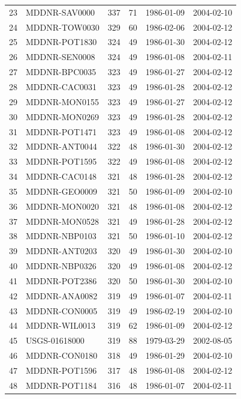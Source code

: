 \documentclass[a4paper,11pt]{article}\usepackage[]{graphicx}\usepackage[]{color}
\begin{document}
\begin{table}[ht]
\begin{tabular}{rlrrll}
  23 & MDDNR-SAV0000 & 337 &  71 & 1986-01-09 & 2004-02-10 \\ 
  24 & MDDNR-TOW0030 & 329 &  60 & 1986-02-06 & 2004-02-12 \\ 
  25 & MDDNR-POT1830 & 324 &  49 & 1986-01-30 & 2004-02-12 \\ 
  26 & MDDNR-SEN0008 & 324 &  49 & 1986-01-08 & 2004-02-11 \\ 
  27 & MDDNR-BPC0035 & 323 &  49 & 1986-01-27 & 2004-02-12 \\ 
  28 & MDDNR-CAC0031 & 323 &  49 & 1986-01-28 & 2004-02-12 \\ 
  29 & MDDNR-MON0155 & 323 &  49 & 1986-01-27 & 2004-02-12 \\ 
  30 & MDDNR-MON0269 & 323 &  49 & 1986-01-28 & 2004-02-12 \\ 
  31 & MDDNR-POT1471 & 323 &  49 & 1986-01-08 & 2004-02-12 \\ 
  32 & MDDNR-ANT0044 & 322 &  48 & 1986-01-30 & 2004-02-12 \\ 
  33 & MDDNR-POT1595 & 322 &  49 & 1986-01-08 & 2004-02-12 \\ 
  34 & MDDNR-CAC0148 & 321 &  48 & 1986-01-28 & 2004-02-12 \\ 
  35 & MDDNR-GEO0009 & 321 &  50 & 1986-01-09 & 2004-02-10 \\ 
  36 & MDDNR-MON0020 & 321 &  48 & 1986-01-08 & 2004-02-12 \\ 
  37 & MDDNR-MON0528 & 321 &  49 & 1986-01-28 & 2004-02-12 \\ 
  38 & MDDNR-NBP0103 & 321 &  50 & 1986-01-10 & 2004-02-12 \\ 
  39 & MDDNR-ANT0203 & 320 &  49 & 1986-01-30 & 2004-02-10 \\ 
  40 & MDDNR-NBP0326 & 320 &  49 & 1986-01-08 & 2004-02-12 \\ 
  41 & MDDNR-POT2386 & 320 &  50 & 1986-01-30 & 2004-02-10 \\ 
  42 & MDDNR-ANA0082 & 319 &  49 & 1986-01-07 & 2004-02-11 \\ 
  43 & MDDNR-CON0005 & 319 &  49 & 1986-02-19 & 2004-02-10 \\ 
  44 & MDDNR-WIL0013 & 319 &  62 & 1986-01-09 & 2004-02-12 \\ 
  45 & USGS-01618000 & 319 &  88 & 1979-03-29 & 2002-08-05 \\ 
  46 & MDDNR-CON0180 & 318 &  49 & 1986-01-29 & 2004-02-10 \\ 
  47 & MDDNR-POT1596 & 317 &  48 & 1986-01-08 & 2004-02-12 \\ 
  48 & MDDNR-POT1184 & 316 &  48 & 1986-01-07 & 2004-02-11 \\ 

\end{tabular}
\end{table}
\end{document}
